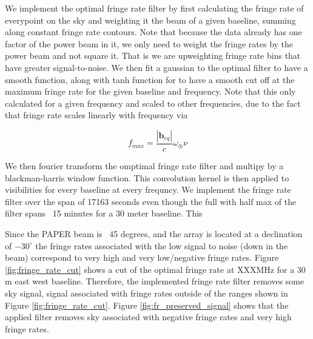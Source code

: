 \documentclass[twocolumn,numberedappendix]{emulateapj}
\begin{document}
{We implement the optimal fringe rate filter by first calculating the fringe rate
of everypoint on the sky and weighting it the beam of a given baseline, summing
along constant fringe rate contours. Note that because the data already has one
factor of the power beam in it, we only need to weight the fringe rates by the
power beam and not square it. That is we are upweighting fringe rate bins that
have greater signal-to-noise.  We then fit a gaussian to the optimal filter to
have a smooth function, along with tanh function for to have a smooth cut off
at the maximum fringe rate for the given baseline and frequency.  Note that
this only calculated for a given frequency and scaled to other frequencies, due
to the fact that fringe rate scales linearly with frequency via

\begin{equation}
    f_{max} = \frac{|\mathbf{b}_{eq}|}{c}\omega_{\oplus}\nu
\end{equation}


We then fourier transform the omptimal fringe rate filter and multipy by a
blackman-harris window function. This convolution kernel is then applied to 
visibilities for every baseline at every frequncy. We implement the fringe rate
filter over the span of 17163 seconds even though the full with half max of the
filter spans ~15 minutes for a 30 meter baseline. This 

Since the PAPER beam is ~45 degrees, and the array is located at a declination
of $-30^{\circ}$ the fringe rates associated with the low signal to noise (down
in the beam) correspond to very high and very low/negative fringe rates. Figure
\ref{fig:fringe_rate_cut} shows a cut of the optimal fringe rate at XXXMHz for a 30
m east west baseline. Therefore, the implemented fringe rate filter removes some
sky signal, signal associated with fringe rates outside of the ranges shown in
Figure \ref{fig:fringe_rate_cut}. Figure \ref{fig:fr_preserved_signal} shows
that the applied filter removes sky associated with negative fringe rates and
very high fringe rates. 

}
\end{document}
